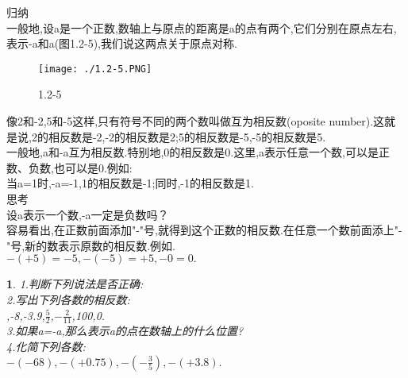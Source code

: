 \documentclass{article}
\newtheorem{exercise}{ }
\begin{document}
	归纳\\
	\indent 一般地,设a是一个正数,数轴上与原点的距离是a的点有两个,它们分别在原点左右,表示-a和a(图1.2-5),我们说这两点关于原点对称.\\
	\begin{figure}[ht!]
		\centering
		\texttt{[image: ./1.2-5.PNG]}
		\caption{1.2-5}
	\end{figure}
	\indent 像2和-2,5和-5这样,只有符号不同的两个数叫做互为相反数(oposite number).这就是说,2的相反数是-2,-2的相反数是2;5的相反数是-5,-5的相反数是5.\\
	\indent 一般地,a和-a互为相反数.特别地,0的相反数是0.这里,a表示任意一个数,可以是正数、负数,也可以是0.例如:\\
	\indent 当a=1时,-a=-1,1的相反数是-1;同时,-1的相反数是1.\\
	思考\\
	\indent 设a表示一个数,-a一定是负数吗？\\
	\indent 容易看出,在正数前面添加"-"号,就得到这个正数的相反数.在任意一个数前面添上"-"号,新的数表示原数的相反数.例如.\\
	\indent $-(+5)=-5, -(-5)=+5, -0=0.$\\
	\begin{exercise}
		1.判断下列说法是否正确:\\	
		\newcommand{\fourch}[4]{
			\indent\makebox[262pt][l]{\qquad(A) #1}\\
			\indent\makebox[262pt][l]{\qquad(B) #2}\\
			\indent\makebox[262pt][l]{\qquad(C) #3}\\
			\indent\makebox[262pt][l]{\qquad(D) #4}\\}
		2.写出下列各数的相反数:\\
		,-8,-3.9,$\frac{5}{2}$,$-\frac{2}{11}$,100,0.\\
		3.如果a=-a,那么表示a的点在数轴上的什么位置?\\
		4.化简下列各数:\\
		\indent $-(-68),-(+0.75),-(-\frac{3}{5}),-(+3.8).$\\
	\end{exercise}	
\end{document}
